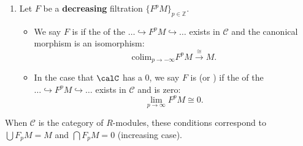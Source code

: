 \begin{definition}
\begin{enumerate}
        \item Let $F$ be a \textbf{decreasing} filtration $\{F^p M\}_{p \in \mathbb{Z}}$.
        \begin{itemize}
            \item We say $F$ is  if the  of the  $\dots \hookrightarrow F^p M \hookrightarrow \dots$ exists in $\mathcal{C}$ and the canonical morphism is an isomorphism:
            $$\text{colim}_{p \to -\infty} F^p M \xrightarrow{\cong} M.$$
            \item In the case that $\calC$ has a  $0$, we say $F$ is  (or ) if the  of the  $\dots \hookrightarrow F^p M \hookrightarrow \dots$ exists in $\mathcal{C}$ and is zero:
            $$\lim_{p \to \infty} F^p M \cong 0.$$
        \end{itemize}
    \end{enumerate}
    When $\mathcal{C}$ is the category of $R$-modules, these conditions correspond to $\bigcup F_p M = M$ and $\bigcap F_p M = 0$ (increasing case).
\end{definition}